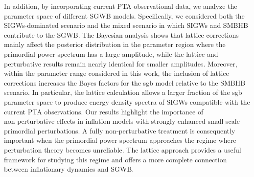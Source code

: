 \documentclass[reprint, 10pt, amsmath, amssymb, floatfix, aps, prd, superscriptaddress, nofootinbib, nobibnotes,twocolumn]{revtex4-1}
\begin{document}
In addition, by incorporating current \ac{PTA} observational data, we analyze the parameter space of different \ac{SGWB} models. Specifically, we considered both the \acp{SIGW}-dominated scenario and the mixed scenario in which \acp{SIGW} and \ac{SMBHB} contribute to the \ac{SGWB}. The Bayesian analysis shows that lattice corrections mainly affect the posterior distribution in the parameter region where the primordial power spectrum has a large amplitude, while the lattice and perturbative results remain nearly identical for smaller amplitudes. Moreover, within the parameter range considered in this work, the inclusion of lattice corrections increases the Bayes factors for the \ac{sgb} model relative to the \ac{SMBHB} scenario. In particular, the lattice calculation allows a larger fraction of the \ac{sgb} parameter space to produce energy density spectra of \acp{SIGW} compatible with the current \ac{PTA} observations. Our results highlight the importance of non‑perturbative effects in inflation models with strongly enhanced small-scale primordial perturbations. A fully non‑perturbative treatment is consequently important when the primordial power spectrum approaches the regime where perturbation theory becomes unreliable. The lattice approach provides a useful framework for studying this regime and offers a more complete connection between inflationary dynamics and \ac{SGWB}.


\appendix
\end{document}
